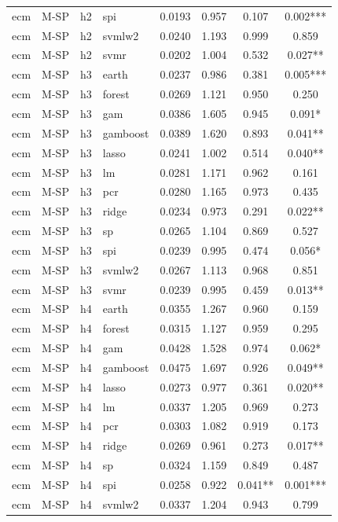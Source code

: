 \begin{ThreePartTable}
\begin{longtable}[t]{llclcccc}
ecm & M-SP & h2 & spi & 0.0193 & 0.957 & 0.107 & 0.002***\\
ecm & M-SP & h2 & svmlw2 & 0.0240 & 1.193 & 0.999 & 0.859\\
ecm & M-SP & h2 & svmr & 0.0202 & 1.004 & 0.532 & 0.027**\\
\addlinespace
ecm & M-SP & h3 & earth & 0.0237 & 0.986 & 0.381 & 0.005***\\
ecm & M-SP & h3 & forest & 0.0269 & 1.121 & 0.950 & 0.250\\
ecm & M-SP & h3 & gam & 0.0386 & 1.605 & 0.945 & 0.091*\\
ecm & M-SP & h3 & gamboost & 0.0389 & 1.620 & 0.893 & 0.041**\\
ecm & M-SP & h3 & lasso & 0.0241 & 1.002 & 0.514 & 0.040**\\
ecm & M-SP & h3 & lm & 0.0281 & 1.171 & 0.962 & 0.161\\
ecm & M-SP & h3 & pcr & 0.0280 & 1.165 & 0.973 & 0.435\\
ecm & M-SP & h3 & ridge & 0.0234 & 0.973 & 0.291 & 0.022**\\
ecm & M-SP & h3 & sp & 0.0265 & 1.104 & 0.869 & 0.527\\
ecm & M-SP & h3 & spi & 0.0239 & 0.995 & 0.474 & 0.056*\\
ecm & M-SP & h3 & svmlw2 & 0.0267 & 1.113 & 0.968 & 0.851\\
ecm & M-SP & h3 & svmr & 0.0239 & 0.995 & 0.459 & 0.013**\\
\addlinespace
ecm & M-SP & h4 & earth & 0.0355 & 1.267 & 0.960 & 0.159\\
ecm & M-SP & h4 & forest & 0.0315 & 1.127 & 0.959 & 0.295\\
ecm & M-SP & h4 & gam & 0.0428 & 1.528 & 0.974 & 0.062*\\
ecm & M-SP & h4 & gamboost & 0.0475 & 1.697 & 0.926 & 0.049**\\
ecm & M-SP & h4 & lasso & 0.0273 & 0.977 & 0.361 & 0.020**\\
ecm & M-SP & h4 & lm & 0.0337 & 1.205 & 0.969 & 0.273\\
ecm & M-SP & h4 & pcr & 0.0303 & 1.082 & 0.919 & 0.173\\
ecm & M-SP & h4 & ridge & 0.0269 & 0.961 & 0.273 & 0.017**\\
ecm & M-SP & h4 & sp & 0.0324 & 1.159 & 0.849 & 0.487\\
ecm & M-SP & h4 & spi & 0.0258 & 0.922 & 0.041** & 0.001***\\
ecm & M-SP & h4 & svmlw2 & 0.0337 & 1.204 & 0.943 & 0.799\\

\end{longtable}
\end{ThreePartTable}
